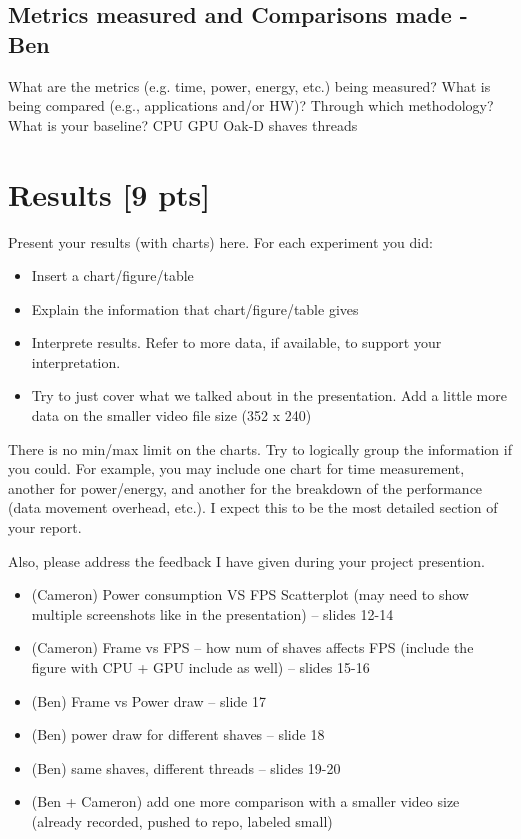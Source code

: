 \documentclass[sigconf,authorversion,nonacm]{acmart}
\begin{document}
\subsection{Metrics measured and Comparisons made - Ben}
What are the metrics (e.g. time, power, energy, etc.) being measured? What is being compared (e.g., applications and/or HW)? Through which methodology? What is your baseline?
CPU GPU Oak-D shaves threads

\section{Results {\small {[9 pts]}}}  
Present your results (with charts) here. For each experiment you did:
\begin{itemize}
    \item Insert a chart/figure/table 
    \item Explain the information that chart/figure/table gives
    \item Interprete results. Refer to more data, if available, to support your interpretation. 
    \item Try to just cover what we talked about in the presentation. Add a little more data on the smaller video file size (352 x 240)
\end{itemize}

There is no min/max limit on the charts. Try to logically group the information if you could. For example, you may include one chart for time measurement, another for power/energy, and another for the breakdown of the performance (data movement overhead, etc.). I expect this to be the most detailed section of your report.

Also, please address the feedback I have given during your project presention.

\begin{itemize}
    \item (Cameron) Power consumption VS FPS Scatterplot (may need to show multiple screenshots like in the presentation) -- slides 12-14 
    \item (Cameron) Frame vs FPS -- how num of shaves affects FPS (include the figure with CPU + GPU include as well) -- slides 15-16
    \item (Ben) Frame vs Power draw -- slide 17
    \item (Ben) power draw for different shaves -- slide 18
    \item (Ben) same shaves, different threads -- slides 19-20
    \item (Ben + Cameron) add one more comparison with a smaller video size (already recorded, pushed to repo, labeled small)
\end{itemize}
\end{document}
